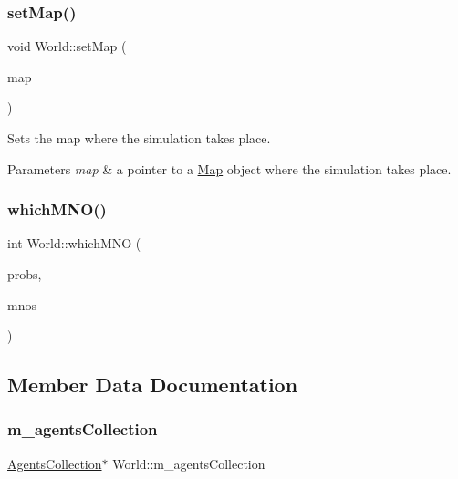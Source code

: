 \subsubsection{\texorpdfstring{set\+Map()}{setMap()}}
{\footnotesize\ttfamily void World\+::set\+Map (\begin{DoxyParamCaption}\item[{\hyperlink{class_map}{Map} $\ast$}]{map }\end{DoxyParamCaption})}

Sets the map where the simulation takes place. 
\begin{DoxyParams}{Parameters}
{\em map} & a pointer to a \hyperlink{class_map}{Map} object where the simulation takes place. \\
\hline
\end{DoxyParams}
\mbox{\label{class_world_a9a982977a44c9e8a4724eaa1e4108679}} 
\subsubsection{\texorpdfstring{which\+M\+N\+O()}{whichMNO()}}
{\footnotesize\ttfamily int World\+::which\+M\+NO (\begin{DoxyParamCaption}\item[{vector$<$ pair$<$ string, double $>$$>$}]{probs,  }\item[{vector$<$ \hyperlink{class_mobile_operator}{Mobile\+Operator} $\ast$$>$}]{mnos }\end{DoxyParamCaption})\hspace{0.3cm}{\ttfamily [private]}}



\subsection{Member Data Documentation}
\mbox{\label{class_world_ae1262689381f00828c0a639b7cbb52a3}} 
\subsubsection{\texorpdfstring{m\+\_\+agents\+Collection}{m\_agentsCollection}}
{\footnotesize\ttfamily \hyperlink{class_agents_collection}{Agents\+Collection}$\ast$ World\+::m\+\_\+agents\+Collection\hspace{0.3cm}{\ttfamily [private]}}

